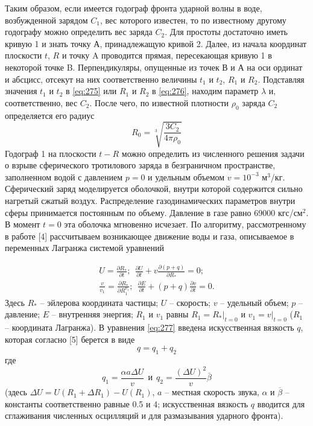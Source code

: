 \documentclass[specialist, subf, href, colorlinks=true, 14pt, final]{disser}
\theoremstyle{definition}
\newcommand{\pdfrac}[2]{\frac{\partial #1}{\partial #2}}
\begin{document}
Таким образом, если имеется годограф фронта ударной волны в воде, возбужденной зарядом $C_1$, вес которого известен, то по известному другому годографу можно определить вес заряда $C_2$. Для простоты достаточно иметь кривую 1 и знать точку А, принадлежащую кривой 2. Далее, из начала координат плоскости $t$, $R$ и точку A проводится прямая, пересекающая кривую 1 в некоторой точке B. Перпендикуляры, опущенные из точек В и А на оси ординат и абсцисс, отсекут на них соответственно величины $t_1$ и $t_2$, $R_1$ и $R_2$. Подставляя значения $t_1$ и $t_2$ в \eqref{eq:275} или $R_1$ и $R_2$ в \eqref{eq:276}, находим параметр $\lambda$ и, соответственно, вес $C_2$. После чего, по известной плотности $\rho_0$ заряда $C_2$ определяется его радиус
\[
  R_{0} = \sqrt[3]{\frac{3C_2}{4\pi\rho_0}}
\]
Годограф 1 на плоскости $t - R$ можно определить из численного решения задачи о взрыве сферического тротилового заряда в безграничном пространстве, заполненном водой с давлением $p = 0$ и удельным объемом $v = 10^{-3}$ м$^3$/кг. Сферический заряд моделируется оболочкой, внутри которой содержится сильно нагретый сжатый воздух. Распределение газодинамических параметров внутри сферы принимается постоянным по объему. Давление в газе равно 69000 кгс/см$^2$. В момент $t=0$ эта оболочка мгновенно исчезает. По алгоритму, рассмотренному в работе [4] рассчитываем возникающее движение воды и газа, описываемое в переменных Лагранжа системой уравнений
\addtocounter{equation}{1}
\begin{equation}\label{eq:277}
  \begin{aligned}
  U = \pdfrac{R_*}{t};\ \ \pdfrac{U}{t} + v\pdfrac{(p+q)}{R_*} = 0;\\
  \frac{v}{v_1} = \pdfrac{R_*}{R_{1}^{\nu_1}};\ \ \pdfrac{E}{t} + (p+q)\pdfrac{v}{t} = 0.
  \end{aligned}
  \tag{7}
\end{equation}
Здесь $R_*$ -- эйлерова координата частицы; $U$ -- скорость; $v$ -- удельный объем; $p$ -- давление; $E$ -- внутренняя энергия; $R_1$ и $v_1$ равны $R_{1} = R_{*}|_{t=0}$ и $v_{1} = v|_{t=0}$ ($R_1$ -- координата Лагранжа). В уравнения \eqref{eq:277} введена искусственная вязкость $q$, которая согласно [5] берется в виде
\[
  q = q_{1} + q_{2}
\]
где
\[
  q_{1} = \frac{\alpha a \Delta U}{v}\ \ \text{и}\ \ q_{2} = \frac{(\Delta U)^{2}}{v}\overline{\beta}
\]
(здесь $\Delta U = U(R_{1} + \Delta R_{1}) - U(R_{1})$, $a$ -- местная скорость звука, $\alpha$ и $\overline{\beta}$ -- константы соответственно равные 0.5 и 4; искусственная вязкость $q$ вводится для сглаживания численных осцилляций и для размазывания ударного фронта).
\end{document}
